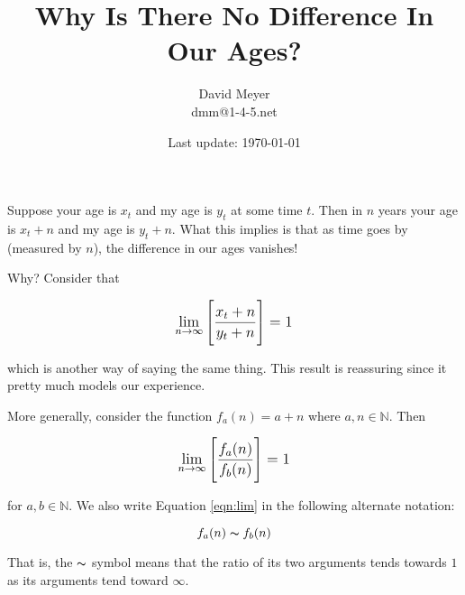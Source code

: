 \documentclass[11pt, oneside]{article}   	%
\title{Why Is There No Difference In Our Ages?}
\author{David Meyer \\ dmm@1-4-5.net}
\date{Last update: \today}							%
\theoremstyle{definition}
\begin{document}
\maketitle

\bigskip
\noindent
Suppose your age is $x_t$ and my age is $y_t$ at some time $t$. Then in $n$ years your age is $x_t + n$ and my age is $y_t + n$. What this implies
is that as time goes by (measured by $n$), the difference in our ages vanishes!

\bigskip
\noindent
Why? Consider that 

\medskip
\bigskip
\begin{equation*}
\centering
{\mathlarger {\lim\limits_{n \to \infty} \Bigg [ \frac{x_t + n}{y_t + n} \Bigg ]  = 1}}
\end{equation*}

\bigskip
\noindent
which is another way of saying the same thing. This result is reassuring since it pretty much models our experience. 

\bigskip
\noindent
More generally, consider the function $f_a(n) = a + n$ where $a,n \in \mathbb{N}$. Then

\medskip
\bigskip
\begin{equation}
\centering
\mathlarger {\lim\limits_{n \to \infty} \Bigg [ \frac{f_a(n)}{f_b(n)} \Bigg ]  = 1}
\label{eqn:lim}
\end{equation}

\bigskip
\noindent
for $a,b \in \mathbb{N}$. We also write Equation \ref{eqn:lim} in the following alternate notation:

\bigskip
\begin{equation*}
f_a(n) \thicksim f_b(n)
 \end{equation*}

\bigskip
\noindent
That is, the $\thicksim$ symbol means that the ratio of its two arguments tends towards $1$ as its arguments tend toward $\infty$.
\end{document}
